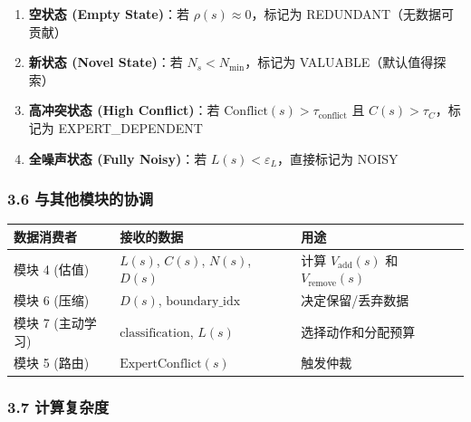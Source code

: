 \documentclass[
  12pt,
]{ctexart}
\providecommand{\tightlist}{%
  \setlength{\itemsep}{0pt}\setlength{\parskip}{0pt}}
\begin{document}
\begin{enumerate}
\def\labelenumi{\arabic{enumi}.}
\tightlist
\item
  \textbf{空状态 (Empty State)}：若 \(\rho(s) \approx 0\)，标记为
  REDUNDANT（无数据可贡献）
\item
  \textbf{新状态 (Novel State)}：若 \(N_s < N_{\min}\)，标记为
  VALUABLE（默认值得探索）
\item
  \textbf{高冲突状态 (High Conflict)}：若
  \(\text{Conflict}(s) > \tau_{\text{conflict}}\) 且
  \(C(s) > \tau_C\)，标记为 EXPERT\_DEPENDENT
\item
  \textbf{全噪声状态 (Fully Noisy)}：若
  \(L(s) < \varepsilon_L\)，直接标记为 NOISY
\end{enumerate}

\subsubsection{3.6
与其他模块的协调}\label{ux4e0eux5176ux4ed6ux6a21ux5757ux7684ux534fux8c03-2}

\begin{longtable}[]{@{}
  >{\raggedright\arraybackslash}p{}
  >{\raggedright\arraybackslash}p{}
  >{\raggedright\arraybackslash}p{}@{}}
\toprule\noalign{}
\begin{minipage}[b]{\linewidth}\raggedright
数据消费者
\end{minipage} & \begin{minipage}[b]{\linewidth}\raggedright
接收的数据
\end{minipage} & \begin{minipage}[b]{\linewidth}\raggedright
用途
\end{minipage} \\
\midrule\noalign{}
\endhead
\bottomrule\noalign{}
\endlastfoot
模块 4 (估值) & \(L(s)\), \(C(s)\), \(N(s)\), \(D(s)\) & 计算
\(V_{\text{add}}(s)\) 和 \(V_{\text{remove}}(s)\) \\
模块 6 (压缩) & \(D(s)\), \(\text{boundary\_idx}\) &
决定保留/丢弃数据 \\
模块 7 (主动学习) & \(\text{classification}\), \(L(s)\) &
选择动作和分配预算 \\
模块 5 (路由) & \(\text{ExpertConflict}(s)\) & 触发仲裁 \\
\end{longtable}

\subsubsection{3.7 计算复杂度}\label{ux8ba1ux7b97ux590dux6742ux5ea6-2}
\end{document}
